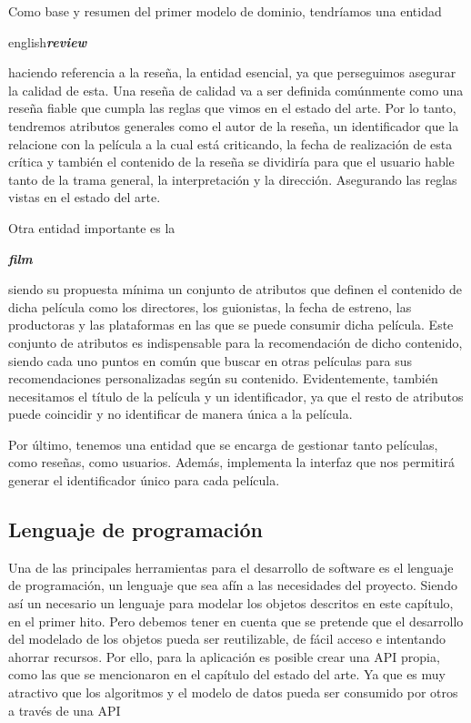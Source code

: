 Como base y resumen del primer modelo de dominio, tendríamos una entidad \begin{otherlanguage}
{english}\textit{\textbf{review}}\end{otherlanguage} haciendo referencia a la reseña, la entidad 
esencial, ya que perseguimos asegurar la calidad de esta. Una reseña de calidad va a ser definida 
comúnmente como una reseña fiable que cumpla las reglas que vimos en el estado del arte. Por lo tanto, 
tendremos atributos generales como el autor de la reseña, un identificador que la relacione con la 
película a la cual está criticando, la fecha de realización de esta crítica y también el 
contenido de la reseña se dividiría para que el usuario hable tanto de la trama general, la 
interpretación y la dirección. Asegurando las reglas vistas en el estado del arte.

Otra entidad importante es la \begin{otherlanguage}{english}\textit{\textbf{film}}\end{otherlanguage}
siendo su propuesta mínima un conjunto de atributos que definen el contenido de dicha película como los directores, 
los guionistas, la fecha de estreno, las productoras y las plataformas en las que se puede consumir dicha película.
Este conjunto de atributos es indispensable para la recomendación de dicho contenido, siendo cada uno puntos en común 
que buscar en otras películas para sus recomendaciones personalizadas según su contenido. Evidentemente, también necesitamos 
el título de la película y un identificador, ya que el resto de atributos puede coincidir y no identificar de manera única a la película.

Por último, tenemos una entidad que se encarga de gestionar tanto películas, como reseñas, como usuarios.
Además, implementa la interfaz que nos permitirá generar el identificador único para cada película.

\subsection{Lenguaje de programación}

Una de las principales herramientas para el desarrollo de software es el lenguaje de programación, un 
lenguaje que sea afín a las necesidades del proyecto. Siendo así un necesario un lenguaje para modelar 
los objetos descritos en este capítulo, en el primer hito. Pero debemos tener en cuenta que se pretende 
que el desarrollo del modelado de los objetos pueda ser reutilizable, de fácil acceso e intentando 
ahorrar recursos. Por ello, para la aplicación es posible crear una API propia, como las que se 
mencionaron en el capítulo del estado del arte. Ya que es muy atractivo que los algoritmos y el modelo 
de datos pueda ser consumido por otros a través de una API


